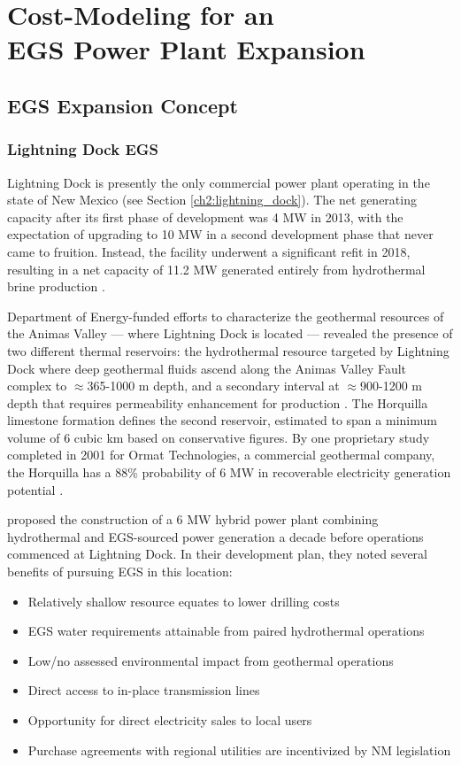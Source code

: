 \chapter{Cost-Modeling for an \\EGS Power Plant Expansion}\label{ch4:cm_prep}
\section{EGS Expansion Concept}\label{ch4:cm_concept}
\subsection{Lightning Dock EGS}\label{ch4:lightning_dock_egs}
Lightning Dock is presently the only commercial power plant operating in the state of New Mexico (see Section \ref{ch2:lightning_dock}). The net generating capacity after its first phase of development was 4 MW in 2013, with the expectation of upgrading to 10 MW in a second development phase that never came to fruition. Instead, the facility underwent a significant refit in 2018, resulting in a net capacity of 11.2 MW generated entirely from hydrothermal brine production \citep{bonafin_repowering_2019}.

Department of Energy-funded efforts to characterize the geothermal resources of the Animas Valley --- where Lightning Dock is located --- revealed the presence of two different thermal reservoirs: the hydrothermal resource targeted by Lightning Dock where deep geothermal fluids ascend along the Animas Valley Fault complex to $\approx$365-1000 m depth, and a secondary interval at $\approx$900-1200 m depth that requires permeability enhancement for production \citep{schochet_development_2001}. The Horquilla limestone formation defines the second reservoir, estimated to span a minimum volume of 6 cubic km based on conservative figures. By one proprietary study completed in 2001 for Ormat Technologies, a commercial geothermal company, the Horquilla has a 88\% probability of 6 MW in recoverable electricity generation potential \citep{schochet_development_2001}.

\citet{schochet_development_2001} proposed the construction of a 6 MW hybrid power plant combining hydrothermal and EGS-sourced power generation a decade before operations commenced at Lightning Dock. In their development plan, they noted several benefits of pursuing EGS in this location:
\begin{itemize}[itemsep=2pt]\label{ch4:ld_egs_support}
    \item Relatively shallow resource equates to lower drilling costs
    \item EGS water requirements attainable from paired hydrothermal operations
    \item Low/no assessed environmental impact from geothermal operations
    \item Direct access to in-place transmission lines  
    \item Opportunity for direct electricity sales to local users
    \item Purchase agreements with regional utilities are incentivized by NM legislation
\end{itemize}

